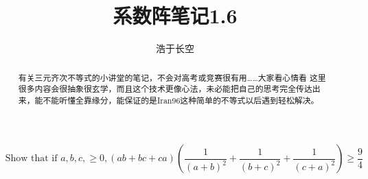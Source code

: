 \documentclass[UTF8]{ctexart}
\begin{document}
	

\title{系数阵笔记1.6}
\author{浩于长空}


\maketitle

$$\text { Show that if } a, b, c,\geq 0,(a b+b c+c a)\left(\frac{1}{(a+b)^{2}}+\frac{1}{(b+c)^{2}}+\frac{1}{(c+a)^{2}}\right) \geq \frac{9}{4}
$$
\begin{flushright}
\end{flushright}
\begin{displaymath}
\end{displaymath}
\begin{abstract}
	有关三元齐次不等式的小讲堂的笔记，不会对高考或竞赛很有用……大家看心情看
	这里很多内容会很抽象很玄学，而且这个技术更像心法，未必能把自己的思考完全传达出来，能不能听懂全靠缘分，能保证的是Iran96这种简单的不等式以后遇到轻松解决。
\end{abstract}

\newpage
\end{document}
